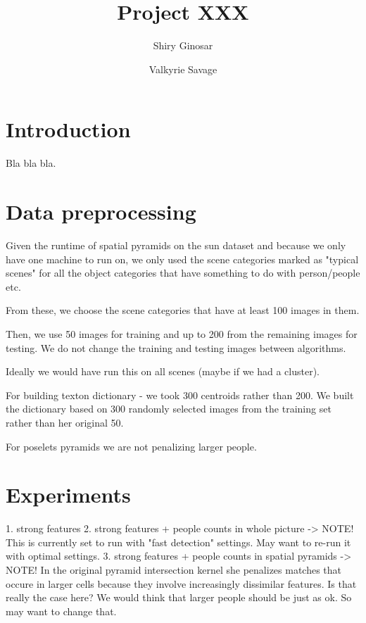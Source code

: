 \documentclass[11pt]{article}
\begin{document}
\title{Project XXX}
\author{Shiry Ginosar \and Valkyrie Savage}

\maketitle


\section{Introduction}
Bla bla bla.

\section{Data preprocessing}
Given the runtime of spatial pyramids on the sun dataset and because we only have one machine to run on, we only used the scene categories marked as "typical scenes" for all the object categories that have something to do with person/people etc.

From these, we choose the scene categories that have at least 100 images in them.

Then, we use 50 images for training and up to 200 from the remaining images for testing. We do not change the training and testing images between algorithms.

Ideally we would have run this on all scenes (maybe if we had a cluster).

For building texton dictionary - we took 300 centroids rather than 200. We built the dictionary based on 300 randomly selected images from the training set rather than her original 50.

For poselets pyramids we are not penalizing larger people.

\section{Experiments}
1. strong features
2. strong features + people counts in whole picture -> NOTE! This is currently set to run with "fast detection" settings. May want to re-run it with optimal settings.
3. strong features + people counts in spatial pyramids -> NOTE! In the original pyramid intersection kernel she penalizes matches that occure in larger cells because they involve increasingly dissimilar features. Is that really the case here? We would think that larger people should be just as ok. So may want to change that.



\end{document}

